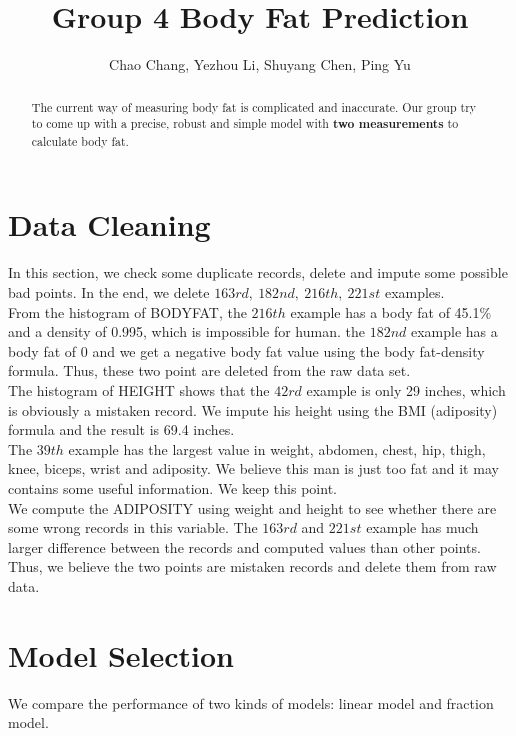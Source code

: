 \documentclass[11pt, twocolumn]{article}
\title{Group 4 Body Fat Prediction}
\author{Chao Chang, Yezhou Li, Shuyang Chen, Ping Yu}
\begin{document}
    
    
    \maketitle


\noindent

\begin{abstract}
The current way of measuring body fat is complicated and inaccurate. Our group try to come up with a precise, robust and simple model with \textbf{two measurements} to calculate body fat.
\end{abstract}



\section{Data Cleaning}


In this section, we check some duplicate records, delete and impute some possible bad points. In the end, we delete $163rd,\ 182nd,\ 216th,\ 221st$ examples.
\\

From the histogram of BODYFAT, the $216th$ example has a body fat of 45.1\% and a density of 0.995, which is impossible for human. the $182nd$ example has a body fat of 0 and we get a negative body fat value using the body fat-density formula. Thus, these two point are deleted from the raw data set. 
\\

The histogram of HEIGHT shows that the $42rd$ example is only 29 inches, which is obviously a mistaken record. We impute his height using the BMI (adiposity) formula and the result is 69.4 inches.
\\

The $39th$ example has the largest value in weight, abdomen, chest, hip, thigh, knee, biceps, wrist and adiposity. We believe this man is just too fat and it may contains some useful information. We keep this point.
\\

We compute the ADIPOSITY  using weight and height to see whether there are some wrong records in this variable. The $163rd$ and $221st$ example has much larger difference between the records and computed values than other points. Thus, we believe the two points are mistaken records and delete them from raw data.

\section{Model Selection}
We compare the performance of two kinds of models: linear model and fraction model.
\end{document}
